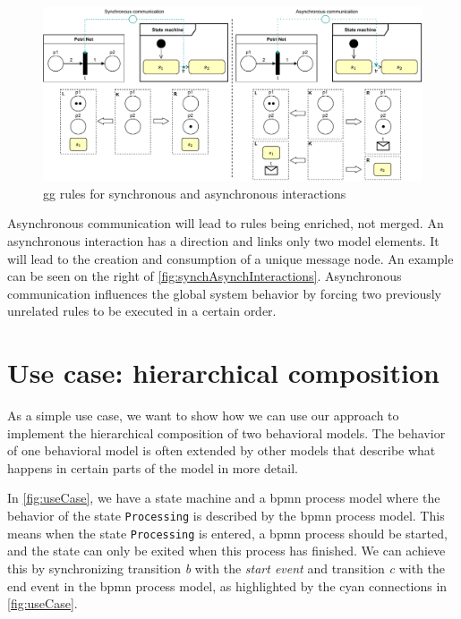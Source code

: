 \documentclass[a4paper]{easychair}
\begin{document}
\begin{figure}[h]
    \centering
    \includegraphics[width=1\textwidth]{images/synch_asynch.pdf}
    \caption{\gls{gg} rules for synchronous and asynchronous interactions}
    \label{fig:synchAsynchInteractions}
\end{figure}

Asynchronous communication will lead to rules being enriched, not merged.
An asynchronous interaction has a direction and links only two model elements.
It will lead to the creation and consumption of a unique message node. 
An example can be seen on the right of \autoref{fig:synchAsynchInteractions}.
Asynchronous communication influences the global system behavior by forcing two previously unrelated rules to be executed in a certain order.




\section{Use case: hierarchical composition}
As a simple use case, we want to show how we can use our approach to implement the hierarchical composition of two behavioral models.
The behavior of one behavioral model is often extended by other models that describe what happens in certain parts of the model in more detail.

In \autoref{fig:useCase}, we have a state machine and a \gls{bpmn} process model where the behavior of the state \texttt{Processing} is described by the \gls{bpmn} process model.
This means when the state \texttt{Processing} is entered, a \gls{bpmn} process should be started, and the state can only be exited when this process has finished.
We can achieve this by synchronizing transition \textit{b} with the \textit{start event} and transition \textit{c} with the end event in the \gls{bpmn} process model, as highlighted by the cyan connections in \autoref{fig:useCase}.
\end{document}
